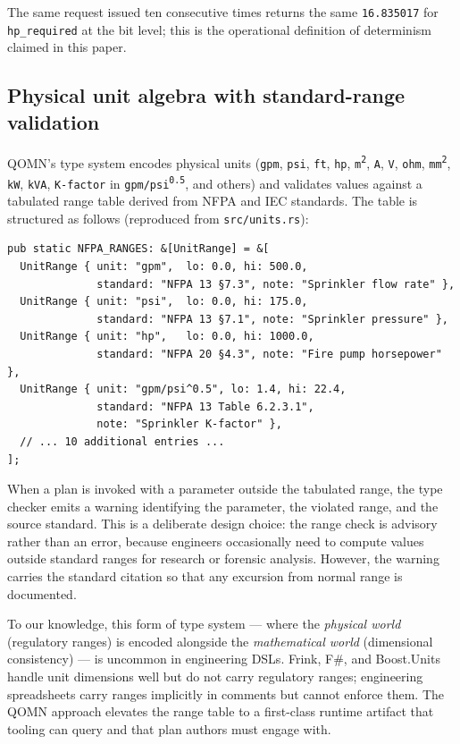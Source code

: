 \documentclass[11pt,a4paper]{article}
\begin{document}
The same request issued ten consecutive times returns the same \texttt{16.835017} for \texttt{hp\_required} at the bit level; this is the operational definition of determinism claimed in this paper.

\subsection{Physical unit algebra with standard-range validation}
\label{sec:units}

QOMN's type system encodes physical units (\texttt{gpm}, \texttt{psi}, \texttt{ft}, \texttt{hp}, \texttt{m\textsuperscript{2}}, \texttt{A}, \texttt{V}, \texttt{ohm}, \texttt{mm\textsuperscript{2}}, \texttt{kW}, \texttt{kVA}, \texttt{K-factor} in \texttt{gpm/psi\textsuperscript{0.5}}, and others) and validates values against a tabulated range table derived from NFPA and IEC standards. The table is structured as follows (reproduced from \texttt{src/units.rs}):

\begin{lstlisting}
pub static NFPA_RANGES: &[UnitRange] = &[
  UnitRange { unit: "gpm",  lo: 0.0, hi: 500.0,
              standard: "NFPA 13 §7.3", note: "Sprinkler flow rate" },
  UnitRange { unit: "psi",  lo: 0.0, hi: 175.0,
              standard: "NFPA 13 §7.1", note: "Sprinkler pressure" },
  UnitRange { unit: "hp",   lo: 0.0, hi: 1000.0,
              standard: "NFPA 20 §4.3", note: "Fire pump horsepower" },
  UnitRange { unit: "gpm/psi^0.5", lo: 1.4, hi: 22.4,
              standard: "NFPA 13 Table 6.2.3.1",
              note: "Sprinkler K-factor" },
  // ... 10 additional entries ...
];
\end{lstlisting}

When a plan is invoked with a parameter outside the tabulated range, the type checker emits a warning identifying the parameter, the violated range, and the source standard. This is a deliberate design choice: the range check is advisory rather than an error, because engineers occasionally need to compute values outside standard ranges for research or forensic analysis. However, the warning carries the standard citation so that any excursion from normal range is documented.

To our knowledge, this form of type system --- where the \emph{physical world} (regulatory ranges) is encoded alongside the \emph{mathematical world} (dimensional consistency) --- is uncommon in engineering DSLs. Frink, F\#, and Boost.Units handle unit dimensions well but do not carry regulatory ranges; engineering spreadsheets carry ranges implicitly in comments but cannot enforce them. The QOMN approach elevates the range table to a first-class runtime artifact that tooling can query and that plan authors must engage with.
\end{document}
